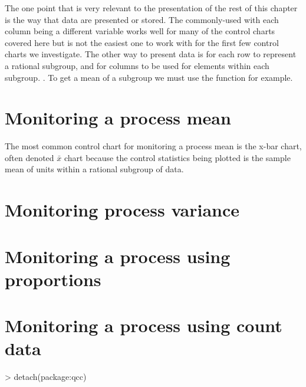 The one point that is very relevant to the presentation of the rest of this chapter is the way that data are presented or stored. The commonly-used  with each column being a different variable works well for many of the control charts covered here but is not the easiest one to work with for the first few control charts we investigate. The other way to present data is for each row to represent a rational subgroup, and for columns to be used for elements within each subgroup. . To get a mean of a subgroup we must use the  function for example.


\section{Monitoring a process mean} 

The most common control chart for monitoring a process mean is the x-bar chart, often denoted $\bar{x}$ chart because the control statistics being plotted is the sample mean of units within a rational subgroup of data.


 
\section{Monitoring process variance} 
 
\section{Monitoring a process using proportions} 
 
 
\section{Monitoring a process using count data} 
 
\begin{Schunk}
\begin{Sinput}
> detach(package:qcc) 
\end{Sinput}
\end{Schunk}

